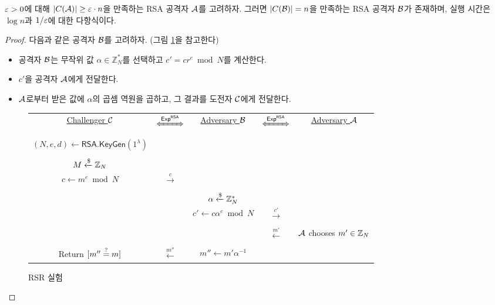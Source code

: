 \begin{tcolorbox}[colback=white, boxrule=0.7pt, sharp corners] 
    \begin{theorem}
        $\varepsilon > 0$에 대해 $|C(\mathcal{A})| \geq \varepsilon \cdot n$을 만족하는 RSA 공격자
        $\mathcal{A}$를 고려하자. 그러면 $|C(\mathcal{B})| = n$을 만족하는 RSA 공격자 $\mathcal{B}$가
        존재하며, 실행 시간은 $\log n$과 $1/\varepsilon$에 대한 다항식이다.
    \end{theorem}
\end{tcolorbox}

\begin{proof}
    다음과 같은 공격자 $\mathcal{B}$를 고려하자. (그림 \ref{fig:rsr}을 참고한다)
    \begin{itemize}
        \item 공격자 $\mathcal{B}$는 무작위 값 $\alpha \in \mathbb{Z}_N^*$를 선택하고 $c' =
        cr^e \bmod N$를 계산한다. 
        \item $c'$을 공격자 $\mathcal{A}$에게 전달한다.
        \item $\mathcal{A}$로부터 받은 값에 $\alpha$의 곱셈 역원을 곱하고, 그 결과를 도전자
        $\mathcal{C}$에게 전달한다.
    \end{itemize}

    \begin{figure}[ht]
        \begin{tcolorbox}[colback=white]
        \centering
            \begin{tabularx}{\linewidth}{CcCcC}
                \underline{Challenger $\mathcal{C}$} & $\xLeftrightarrow{\EXP^{\RSA}}$ & \underline{Adversary $\mathcal{B}$} & $\xLeftrightarrow{\EXP^{\RSA}}$ & \underline{Adversary $\mathcal{A}$} \\
                \\
                $(N, e, d) \gets \textsf{RSA.KeyGen}(1^{\lambda})$ & & & & \\
                \\
                $M \xleftarrow{\$} \mathbb{Z}_N$ & & & & \\
                $c \gets m^e \bmod N$ & $\xrightarrow{c}$ & & & \\
                \\
                & & $\alpha \xleftarrow{\$} \mathbb{Z}^*_N$ & & \\
                & & $c' \gets c \alpha^e \bmod N$ & $\xrightarrow{c'}$ & \\
                \\
                & & & $\xleftarrow{m'}$ & $\mathcal{A}$ chooses $m' \in \mathbb{Z}_N$ \\
                \\
                Return $[m'' \overset{?}{=} m]$ & $\xleftarrow{m''}$ & $m'' \gets m' \alpha^{-1}$ & & \\
            \end{tabularx}  
        \end{tcolorbox}
        \caption{RSR 실험}
        \label{fig:rsr}
    \end{figure}


\end{proof}
